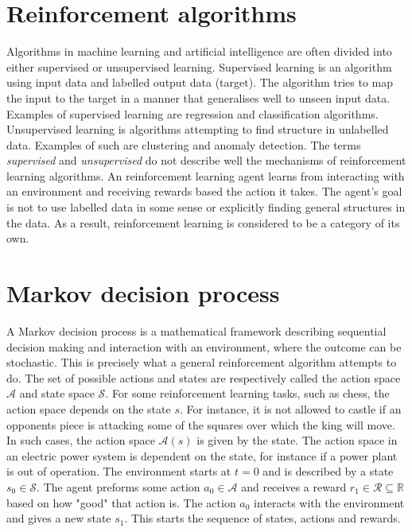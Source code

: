 \documentclass[class=book, crop=false]{standalone}
\begin{document}
\section{Reinforcement algorithms}
Algorithms in machine learning and artificial intelligence are often divided into either supervised or unsupervised learning. Supervised learning is an algorithm using input data and labelled output data (target). The algorithm tries to map the input to the target in a manner that generalises well to unseen input data. Examples of supervised learning are regression and classification algorithms. Unsupervised learning is algorithms attempting to find structure in unlabelled data. Examples of such are clustering and anomaly detection. The terms \textit{supervised} and \textit{unsupervised} do not describe well the mechanisms of reinforcement learning algorithms. An reinforcement learning agent learns from interacting with an environment and receiving rewards based the action it takes. The agent's goal is not to use labelled data in some sense or explicitly finding general structures in the data. As a result, reinforcement learning is considered to be a category of its own\cite{Sutton1998}. 

\section{Markov decision process}\label{section:markov_decision_process}

A Markov decision process is a mathematical framework describing sequential decision making and interaction with an environment, where the outcome can be stochastic. This is precisely what
a general reinforcement algorithm attempts to do. The set of possible actions and states are respectively called the action space $\mathcal{A}$ and state space $\mathcal{S}$. For some reinforcement learning tasks, such as chess, the action space depends on the state $s$. For instance, it is not allowed to castle if an opponents piece is attacking some of the squares over which the king will move. In such cases, the action space $\mathcal{A}(s)$ is given by the state. The action space in an electric power system is dependent on the state, for instance if a power plant is out of operation. The environment starts at $t=0$ and is described by a state $s_{0} \in \mathcal{S}$. The agent preforms some action $a_{0}\in \mathcal{A}$ and receives a reward $r_{1}\in \mathcal{R} \subseteq \mathbb{R} $ based on how "good" that action is. The action $a_{0}$ interacts with the environment and gives a new state $s_{1}$. This starts the sequence of states, actions and rewards.
\end{document}
